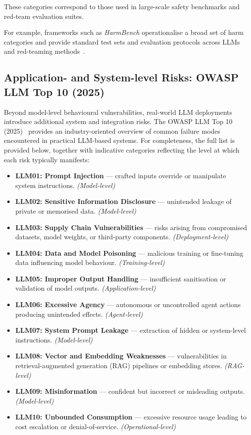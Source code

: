 These categories correspond to those used in large-scale safety benchmarks and red-team evaluation suites.

For example, frameworks such as {\em HarmBench} operationalise a broad set of harm categories and provide standard test sets and evaluation protocols across LLMs and red-teaming methods~\cite{mazeika2024harmbench}.

\subsection{Application- and System-level Risks: OWASP LLM Top 10 (2025)}\label{subsec:owasp}

Beyond model-level behavioural vulnerabilities, real-world LLM deployments introduce additional system and integration risks.
The OWASP LLM Top 10 (2025)~\cite{owasp2025top} provides an industry-oriented overview of common failure modes encountered in practical LLM-based systems.
For completeness, the full list is provided below, together with indicative categories reflecting the level at which each risk typically manifests:

\begin{itemize}
    \item \textbf{LLM01: Prompt Injection} — crafted inputs override or manipulate system instructions. \emph{(Model-level)}
    \item \textbf{LLM02: Sensitive Information Disclosure} — unintended leakage of private or memorised data. \emph{(Model-level)}
    \item \textbf{LLM03: Supply Chain Vulnerabilities} — risks arising from compromised datasets, model weights, or third-party components. \emph{(Deployment-level)}
    \item \textbf{LLM04: Data and Model Poisoning} — malicious training or fine-tuning data influencing model behaviour. \emph{(Training-level)}
    \item \textbf{LLM05: Improper Output Handling} — insufficient sanitisation or validation of model outputs. \emph{(Application-level)}
    \item \textbf{LLM06: Excessive Agency} — autonomous or uncontrolled agent actions producing unintended effects. \emph{(Agent-level)}
    \item \textbf{LLM07: System Prompt Leakage} — extraction of hidden or system-level instructions. \emph{(Model-level)}
    \item \textbf{LLM08: Vector and Embedding Weaknesses} — vulnerabilities in retrieval-augmented generation (RAG) pipelines or embedding stores. \emph{(RAG-level)}
    \item \textbf{LLM09: Misinformation} — confident but incorrect or misleading outputs. \emph{(Model-level)}
    \item \textbf{LLM10: Unbounded Consumption} — excessive resource usage leading to cost escalation or denial-of-service. \emph{(Operational-level)}
\end{itemize}

